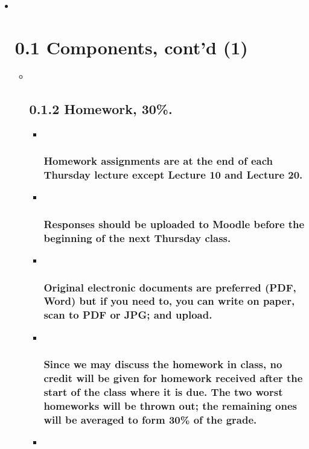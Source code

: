 \documentclass[11pt]{article}
\begin{document}
    \begin{itemize}
\item ~
  \section{\texorpdfstring{{0.1 Components, cont'd
  (1)}}{0.1 Components, cont'd (1)}}\label{components-contd-1}

  \begin{itemize}
  \item ~
    \subsection{0.1.2 Homework, 30\%.}\label{homework-30.}

    \begin{itemize}
    \item ~
      \subsubsection{Homework assignments are at the end of each
      Thursday lecture except Lecture 10 and Lecture
      20.}\label{homework-assignments-are-at-the-end-of-each-thursday-lecture-except-lecture-10-and-lecture-20.}
    \item ~
      \subsubsection{Responses should be uploaded to Moodle before the
      beginning of the next Thursday
      class.}\label{responses-should-be-uploaded-to-moodle-before-the-beginning-of-the-next-thursday-class.}
    \item ~
      \subsubsection{Original electronic documents are preferred (PDF,
      Word) but if you need to, you can write on paper, scan to PDF or
      JPG; and
      upload.}\label{original-electronic-documents-are-preferred-pdf-word-but-if-you-need-to-you-can-write-on-paper-scan-to-pdf-or-jpg-and-upload.}
    \item ~
      \subsubsection{Since we may discuss the homework in class, no
      credit will be given for homework received after the start of the
      class where it is due. The two worst homeworks will be thrown out;
      the remaining ones will be averaged to form 30\% of the
      grade.}\label{since-we-may-discuss-the-homework-in-class-no-credit-will-be-given-for-homework-received-after-the-start-of-the-class-where-it-is-due.-the-two-worst-homeworks-will-be-thrown-out-the-remaining-ones-will-be-averaged-to-form-30-of-the-grade.}
    \item ~

\end{itemize}
\end{itemize}
\end{itemize}
\end{document}
